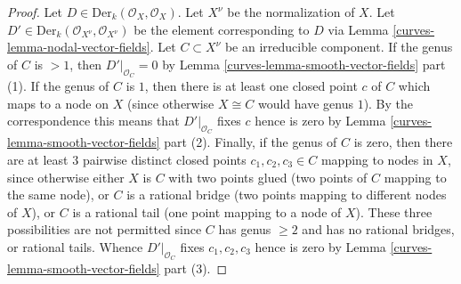\begin{proof}

Let $D \in \text{Der}_k(\mathcal{O}_X, \mathcal{O}_X)$.
Let $X^\nu$ be the normalization of $X$.
Let $D' \in \text{Der}_k(\mathcal{O}_{X^\nu}, \mathcal{O}_{X^\nu})$
be the element corresponding to $D$ via Lemma \ref{curves-lemma-nodal-vector-fields}.
Let $C \subset X^\nu$ be an irreducible component.
If the genus of $C$ is $> 1$, then $D'|_{\mathcal{O}_C} = 0$
by Lemma \ref{curves-lemma-smooth-vector-fields} part (1).
If the genus of $C$ is $1$, then there is at least one closed point $c$ of $C$
which maps to a node on $X$ (since otherwise $X \cong C$ would have genus $1$).
By the correspondence this means that
$D'|_{\mathcal{O}_C}$ fixes $c$ hence is zero by
Lemma \ref{curves-lemma-smooth-vector-fields} part (2).
Finally, if the genus of $C$ is zero, then there are at least
$3$ pairwise distinct closed points $c_1, c_2, c_3 \in C$
mapping to nodes in $X$, since otherwise either
$X$ is $C$ with two points glued (two points of $C$ mapping
to the same node), or
$C$ is a rational bridge (two points mapping to different nodes of $X$), or
$C$ is a rational tail (one point mapping to a node of $X$).
These three possibilities are not permitted since
$C$ has genus $\geq 2$ and has no rational bridges, or rational tails.
Whence $D'|_{\mathcal{O}_C}$ fixes $c_1, c_2, c_3$ hence is zero by
Lemma \ref{curves-lemma-smooth-vector-fields} part (3).
\end{proof}



